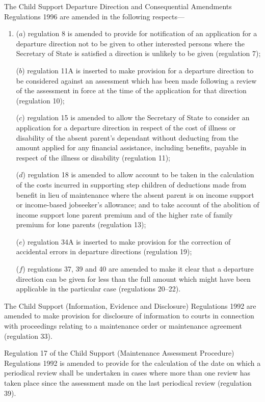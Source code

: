 \documentclass[12pt,a4paper]{article}
\begin{document}
 The Child Support Departure Direction and Consequential Amendments Regulations 1996 are amended in the following respects—
\begin{enumerate}\item[]
 ($a$) regulation 8 is amended to provide for notification of an application for a departure direction not to be given to other interested persons where the Secretary of State is satisfied a direction is unlikely to be given (regulation 7);

 ($b$) regulation 11A is inserted to make provision for a departure direction to be considered against an assessment which has been made following a review of the assessment in force at the time of the application for that direction (regulation 10);

 ($c$) regulation 15 is amended to allow the Secretary of State to consider an application for a departure direction in respect of the cost of illness or disability of the absent parent’s dependant without deducting from the amount applied for any financial assistance, including benefits, payable in respect of the illness or disability (regulation 11);

 ($d$) regulation 18 is amended to allow account to be taken in the calculation of the costs incurred in supporting step children of deductions made from benefit in lieu of maintenance where the absent parent is on income support or income-based jobseeker’s allowance; and to take account of the abolition of income support lone parent premium and of the higher rate of family premium for lone parents (regulation 13);

 ($e$) regulation 34A is inserted to make provision for the correction of accidental errors in departure directions (regulation 19);

 ($f$) regulations 37, 39 and 40 are amended to make it clear that a departure direction can be given for less than the full amount which might have been applicable in the particular case (regulations 20--22).
\end{enumerate}

  The Child Support (Information, Evidence and Disclosure) Regulations 1992 are amended to make provision for disclosure of information to courts in connection with proceedings relating to a maintenance order or maintenance agreement (regulation 33).

  Regulation 17 of the Child Support (Maintenance Assessment Procedure) Regulations 1992 is amended to provide for the calculation of the date on which a periodical review shall be undertaken in cases where more than one review has taken place since the assessment made on the last periodical review (regulation 39).
\end{document}
